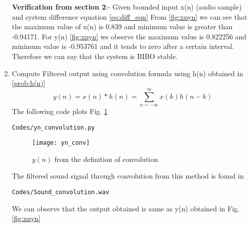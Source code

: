 \documentclass[journal,12pt,twocolumn]{IEEEtran}
\renewcommand\thesection{\arabic{section}}
\begin{document}
\begin{enumerate}[label=\thesection.\arabic*,ref=\thesection.\theenumi]
\textbf{Verification from section 2}:-
Given bounded input x(n) (audio sample) and system difference equation \ref{eq:diff_eqn}
From \ref{fig:xnyn} we can see that the maximum value of x(n) is 0.839 and minimum value is greater than -0.94171.
For y(n) \ref{fig:xnyn} we observe the maximum value is 0.822256 and minimum value is -0.953761 and it tends to zero after a certain interval.
Therefore we can say that the system is BIBO stable.\\
\item Compute Filtered output using convolution formula using h(n) obtained in \ref{prob:h(n)}
%
\begin{equation}
\label{eq:convolution}
y(n) = x(n)*h(n) = \sum_{n=-\infty}^{\infty}x(k)h(n-k)
\end{equation}
\solution The following code plots Fig. \ref{fig:yn_conv}
%
\begin{lstlisting}
Codes/yn_convolution.py
\end{lstlisting}
\begin{figure}[!ht]
\centering
\texttt{[image: yn\_conv]}
\caption{$y(n)$ from the definition of convolution}
\label{fig:yn_conv}
\end{figure}
The filtered sound signal through convolution from this method is found in
\begin{lstlisting}
Codes/Sound_convolution.wav
\end{lstlisting}
We can observe that the output obtained is same as y(n) obtained in Fig. \ref{fig:xnyn}
\end{enumerate}
\end{document}
